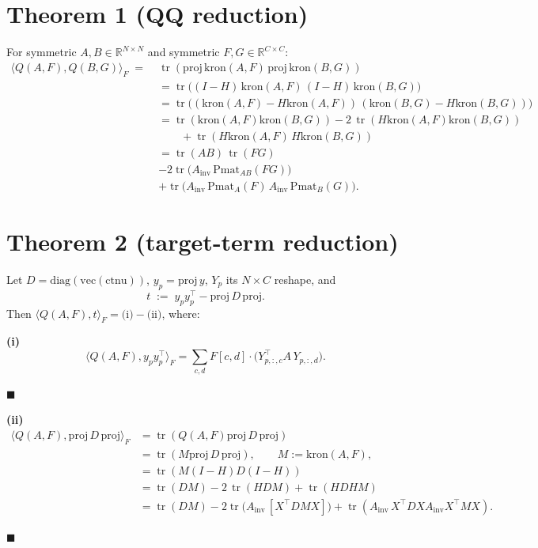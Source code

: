 \documentclass[11pt]{article}
\newcommand{\tr}{\operatorname{tr}}
\newcommand{\proj}{\mathrm{proj}}
\newcommand{\kron}{\mathrm{kron}}
\newcommand{\Ainv}{A_{\mathrm{inv}}}
\newcommand{\Pmat}{\mathrm{Pmat}}
\newcommand{\qed}{\hfill$\blacksquare$}
\begin{document}
\section*{Theorem 1 (QQ reduction)}

For symmetric $A,B \in \mathbb{R}^{N\times N}$ and symmetric $F,G \in \mathbb{R}^{C\times C}$:
\begin{align}
\langle Q(A,F),Q(B,G)\rangle_F \;=\; & \tr(\proj\,\kron(A,F)\,\proj\,\kron(B,G)) \nonumber\\
 &= \tr\big((I - H)\,\kron(A,F)\,(I - H)\,\kron(B,G)\big) \nonumber \\
 &= \tr\big((\kron(A,F) - H\kron(A,F))\,(\kron(B,G) - H\kron(B,G))\big) \nonumber \\
 &= \tr(\kron(A,F)\kron(B,G)) - 2\,\tr(H\kron(A,F)\kron(B,G)) \nonumber \\
 & \qquad + \tr(H\kron(A,F)\,H\kron(B,G)) \nonumber \\
 &= \tr(AB)\,\tr(FG) \nonumber\\
 & - 2 \tr\big(\Ainv\,\Pmat_{AB}(FG)\big) \nonumber\\
 & + \tr\big(\Ainv\,\Pmat_A(F)\,\Ainv\,\Pmat_B(G)\big).
\label{eq:theorem1}
\end{align}



\section*{Theorem 2 (target-term reduction)}

Let $D = \mathrm{diag}(\mathrm{vec}(\mathrm{ctnu}))$, $y_p = \proj\,y$, $Y_p$ its $N\times C$ reshape, and
\[
t \;:=\; y_p y_p^\top - \proj\,D\,\proj.
\]
Then $\langle Q(A,F), t\rangle_F = \text{(i)} - \text{(ii)}$, where:

\textbf{(i)}
\begin{equation}
\langle Q(A,F), y_p y_p^\top\rangle_F = \sum_{c,d} F[c,d]\cdot\big(Y_{p,:,c}^\top A\, Y_{p,:,d}\big).
\label{eq:term1}
\end{equation}

\qed

\textbf{(ii)}
\begin{align}
\langle Q(A,F), \proj\,D\,\proj\rangle_F &= \tr(Q(A,F) \proj\,D\,\proj) \nonumber\\
&= \tr(M \proj\,D\,\proj), \qquad M := \kron(A,F), \nonumber\\
&= \tr(M (I - H) D (I - H)) \nonumber\\
&= \tr(DM) - 2\,\tr(HDM) + \tr(HDHM) \nonumber\\
&= \tr(DM) - 2 \tr\big(\Ainv\,[X^\top D M X]\big) + \tr(\Ainv\,X^\top D X \Ainv X^\top M X).
\label{eq:term2}
\end{align}


\qed
\end{document}
